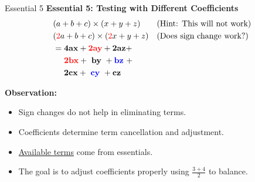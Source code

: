 \documentclass{beamer}
\begin{document}
\begin{frame}{Essential 5}
    \textbf{Essential 5: Testing with Different Coefficients}
    \begin{align*}
        &(a + b + c) \times (x + y + z)  && \text{(Hint: This will not work)} \\
        &(\textcolor{red}{2}a + b + c) \times (\textcolor{red}{2}x + y + z)  && \text{(Does sign change work?)} \\
        &= \mathbf{4ax} + \textcolor{red}{\mathbf{2ay}} + \mathbf{2az} + \\
        & \ \ \ \ \textcolor{red}{\mathbf{2bx}} + \ \mathbf{by} \ + \textcolor{blue}{\mathbf{bz}} \ + \\
        & \ \ \ \ \mathbf{2cx} + \ \textcolor{blue}{\mathbf{cy}} \ + \mathbf{cz} 
    \end{align*}
    
    \textbf{Observation:}
    \begin{itemize}
        \item Sign changes do not help in eliminating terms.
        \item Coefficients determine term cancellation and adjustment.
        \item \underline{Available terms} come from essentials.
        \item The goal is to adjust coefficients properly using \(\frac{3+4}{2}\) to balance.
    \end{itemize}
\end{frame}
\end{document}
